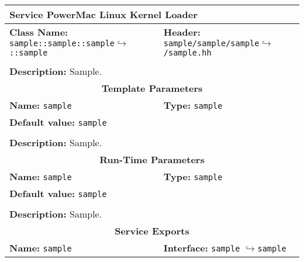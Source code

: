 \newpage
\begin{center}
	\begin{tabular}{|p{7.5cm}|p{7.5cm}|}
		\hline
		\multicolumn{2}{|l|}{\textbf{\Large Service PowerMac Linux Kernel Loader}}\\
		\hline
		\multicolumn{1}{|p{7.5cm}}{\textbf{Class Name:} \newline \texttt{sample::sample::sample}\newline$\hookrightarrow$\texttt{::sample}} & \multicolumn{1}{p{7.5cm}|}{\textbf{Header:} \newline \texttt{sample/sample/sample}\newline$\hookrightarrow$\texttt{/sample.hh}}\\
		\multicolumn{2}{|l|}{}\\
		\multicolumn{2}{|p{15cm}|}{\textbf{Description:} \newline Sample.}\\
		\hline
		\hline
		\multicolumn{2}{|c|}{\textbf{\large Template Parameters}}\\
		\hline
		\multicolumn{1}{|p{7.5cm}}{\textbf{Name:} \texttt{sample}} & \multicolumn{1}{p{7.5cm}|}{\textbf{Type:} \texttt{sample}}\\
		\multicolumn{2}{|p{15cm}|}{\textbf{Default value:} \texttt{sample}}\\
		\multicolumn{2}{|l|}{}\\
		\multicolumn{2}{|p{15cm}|}{\textbf{Description:} \newline Sample.}\\
		\hline
		\hline
		\multicolumn{2}{|c|}{\textbf{\large Run-Time Parameters}}\\
		\hline
		\multicolumn{1}{|p{7.5cm}}{\textbf{Name:} \texttt{sample}} & \multicolumn{1}{p{7.5cm}|}{\textbf{Type:} \texttt{sample}}\\
		\multicolumn{2}{|p{15cm}|}{\textbf{Default value:} \texttt{sample}}\\
		\multicolumn{2}{|l|}{}\\
		\multicolumn{2}{|p{15cm}|}{\textbf{Description:} \newline Sample.}\\
		\hline
		\hline
		\multicolumn{2}{|c|}{\textbf{\large Service Exports}}\\
		\hline
		\multicolumn{1}{|p{7.5cm}}{\textbf{Name:} \texttt{sample}} & \multicolumn{1}{p{7.5cm}|}{\textbf{Interface:} \newline \texttt{sample} \newline$\hookrightarrow$\texttt{sample}}\\

\end{tabular}
\end{center}
